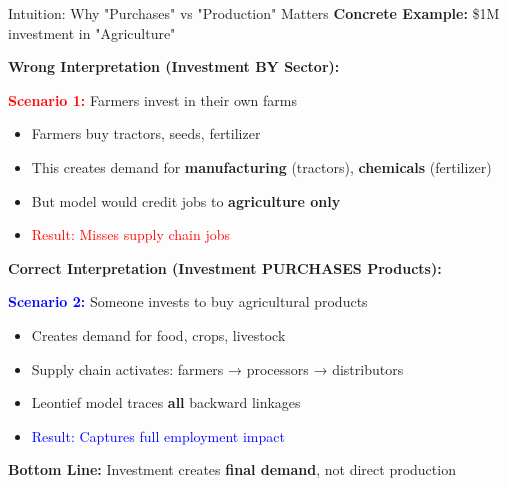 \documentclass[10pt]{beamer}
\begin{document}
\begin{frame}{Intuition: Why "Purchases" vs "Production" Matters}
\textbf{Concrete Example:} \$1M investment in "Agriculture"

\vspace{0.3cm}

\textbf{Wrong Interpretation (Investment BY Sector):}

\vspace{0.2cm}

\textcolor{red}{\textbf{Scenario 1:}} Farmers invest in their own farms
\begin{itemize}
    \item Farmers buy tractors, seeds, fertilizer
    \item This creates demand for \textbf{manufacturing} (tractors), \textbf{chemicals} (fertilizer)
    \item But model would credit jobs to \textbf{agriculture only}
    \item \textcolor{red}{Result: Misses supply chain jobs}
\end{itemize}

\vspace{0.4cm}

\textbf{Correct Interpretation (Investment PURCHASES Products):}

\vspace{0.2cm}

\textcolor{blue}{\textbf{Scenario 2:}} Someone invests to buy agricultural products
\begin{itemize}
    \item Creates demand for food, crops, livestock
    \item Supply chain activates: farmers → processors → distributors
    \item Leontief model traces \textbf{all} backward linkages
    \item \textcolor{blue}{Result: Captures full employment impact}
\end{itemize}

\vspace{0.4cm}

\textbf{Bottom Line:} Investment creates \textbf{final demand}, not direct production

\end{frame}

\end{document}
